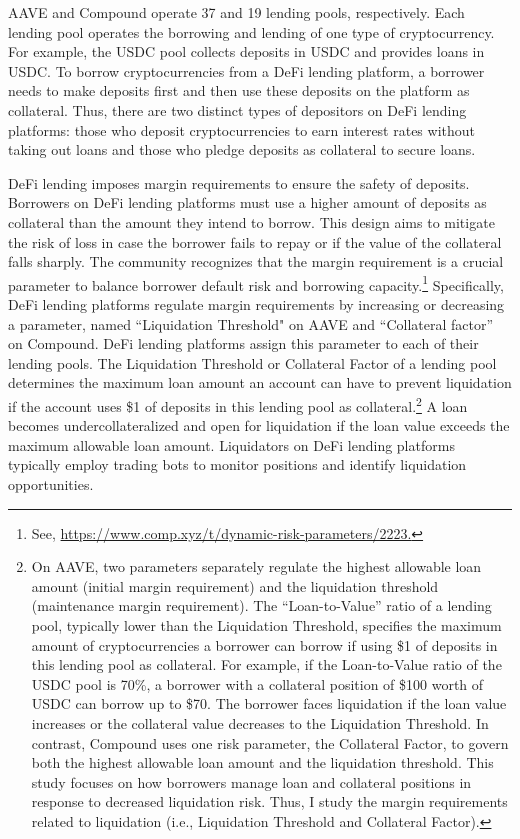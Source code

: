 \documentclass[12pt]{article}
\begin{document}
    AAVE and Compound operate 37 and 19 lending pools, respectively. Each lending pool operates the borrowing and lending of one type of cryptocurrency. For example, the USDC pool collects deposits in USDC and provides loans in USDC. To borrow cryptocurrencies from a DeFi lending platform, a borrower needs to make deposits first and then use these deposits on the platform as collateral. Thus, there are two distinct types of depositors on DeFi lending platforms: those who deposit cryptocurrencies to earn interest rates without taking out loans and those who pledge deposits as collateral to secure loans.

DeFi lending imposes margin requirements to ensure the safety of deposits. Borrowers on DeFi lending platforms must use a higher amount of deposits as collateral than the amount they intend to borrow. This design aims to mitigate the risk of loss in case the borrower fails to repay or if the value of the collateral falls sharply. The community recognizes that the margin requirement is a crucial parameter to balance borrower default risk and borrowing capacity.\footnote{See, \href{https://www.comp.xyz/t/dynamic-risk-parameters/2223}{https://www.comp.xyz/t/dynamic-risk-parameters/2223.}} Specifically, DeFi lending platforms regulate margin requirements by increasing or decreasing a parameter, named ``Liquidation Threshold" on AAVE and ``Collateral factor'' on Compound. DeFi lending platforms assign this parameter to each of their lending pools. The Liquidation Threshold or Collateral Factor of a lending pool determines the maximum loan amount an account can have to prevent liquidation if the account uses \$1 of deposits in this lending pool as collateral.\footnote{On AAVE, two parameters separately regulate the highest allowable loan amount (initial margin requirement) and the liquidation threshold (maintenance margin requirement). The “Loan-to-Value” ratio of a lending pool, typically lower than the Liquidation Threshold, specifies the maximum amount of cryptocurrencies a borrower can borrow if using \$1 of deposits in this lending pool as collateral. For example, if the Loan-to-Value ratio of the USDC pool is 70\%, a borrower with a collateral position of \$100 worth of USDC can borrow up to \$70. The borrower faces liquidation if the loan value increases or the collateral value decreases to the Liquidation Threshold. In contrast, Compound uses one risk parameter, the Collateral Factor, to govern both the highest allowable loan amount and the liquidation threshold. This study focuses on how borrowers manage loan and collateral positions in response to decreased liquidation risk. Thus, I study the margin requirements related to liquidation (i.e., Liquidation Threshold and Collateral Factor).} A loan becomes undercollateralized and open for liquidation if the loan value exceeds the maximum allowable loan amount. Liquidators on DeFi lending platforms typically employ trading bots to monitor positions and identify liquidation opportunities. 
\end{document}
